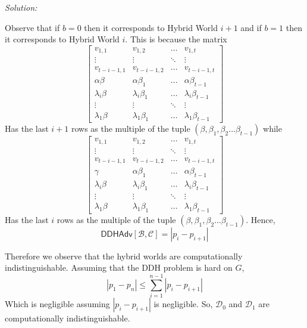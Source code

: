 \documentclass[a4paper, 11pt]{article}
\newenvironment{solution}
    {\textit{Solution:}}
    {\clearpage}
\newcommand{\calB}{\mathcal{B}}
\newcommand{\calC}{\mathcal{C}}
\newcommand{\calD}{\mathcal{D}}
\begin{document}
\begin{solution}
\begin{enumerate}[(a)]
              Observe that if $b=0$ then it corresponds to Hybrid World $i+1$ and if $b=1$ then it corresponds to Hybrid World $i$. This is because the matrix
              $$
                  \begin{bmatrix}
                      {v_{1,1}}        & {v_{1,2}}          & \dots  & {v_{1,t}}              \\
                      \vdots           & \vdots             & \ddots & \vdots                 \\
                      {v_{t-i-1,1}}    & {v_{t-i-1,2}}      & \dots  & {v_{t-i-1,t}}          \\
                      \alpha\beta      & {\alpha\beta_1}    & \dots  & {\alpha\beta_{t-1}}    \\
                      {\lambda_i\beta} & {\lambda_i\beta_1} & \dots  & {\lambda_i\beta_{t-1}} \\
                      \vdots           & \vdots             & \ddots & \vdots                 \\
                      {\lambda_1\beta} & {\lambda_1\beta_1} & \dots  & {\lambda_1\beta_{t-1}}
                  \end{bmatrix}
              $$
              Has the last $i+1$ rows as the multiple of the tuple $(\beta, \beta_1, \beta_2\dots\beta_{t-1})$ while
              $$
                  \begin{bmatrix}
                      {v_{1,1}}        & {v_{1,2}}          & \dots  & {v_{1,t}}              \\
                      \vdots           & \vdots             & \ddots & \vdots                 \\
                      {v_{t-i-1,1}}    & {v_{t-i-1,2}}      & \dots  & {v_{t-i-1,t}}          \\
                      \gamma     & {\alpha\beta_1}    & \dots  & {\alpha\beta_{t-1}}          \\
                      {\lambda_i\beta} & {\lambda_i\beta_1} & \dots  & {\lambda_i\beta_{t-1}} \\
                      \vdots           & \vdots             & \ddots & \vdots                 \\
                      {\lambda_1\beta} & {\lambda_1\beta_1} & \dots  & {\lambda_1\beta_{t-1}}
                  \end{bmatrix}
              $$
              Has the last $i$ rows as the multiple of the tuple $(\beta, \beta_1, \beta_2\dots\beta_{t-1})$. Hence, $$\mathsf{DDHAdv}[\calB, \calC]=|p_i-p_{i+1}|$$
            
            \vspace{20pt}
            Therefore we observe that the hybrid worlds are computationally indistinguishable. Assuming that the DDH problem is hard on $G$,
            $$|p_1-p_{n}|\leq \sum_{i=1}^{n-1}|p_i-p_{i+1}|$$
            Which is negligible assuming $|p_i-p_{i+1}|$ is negligible. So, $\calD_0$ and $\calD_1$ are computationally indistinguishable.



    \end{enumerate}
\end{solution}
\end{document}
